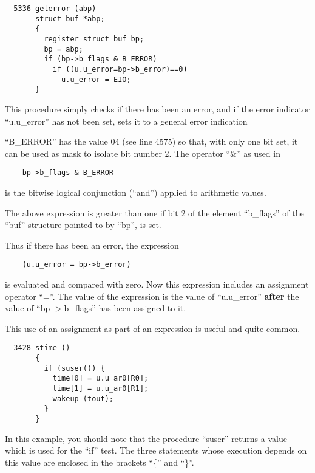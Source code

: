 
\begin{verbatim}
  5336 geterror (abp)
       struct buf *abp;
       {
         register struct buf bp;
         bp = abp;
         if (bp->b flags & B_ERROR)
           if ((u.u_error=bp->b_error)==0)
             u.u_error = EIO;
       }
\end{verbatim}



This procedure simply checks if there
has been an error, and if the error
indicator ``u.u\_error'' has not been set,
sets it to a general error indication

``B\_ERROR'' has the value 04 (see line
4575) so that, with only one bit set,
it can be used as mask to isolate bit
number 2. The operator ``\&'' as used in

\begin{verbatim}
    bp->b_flags & B_ERROR
\end{verbatim}

\noindent is the bitwise logical conjunction
(``and'') applied to arithmetic values.

The above expression is greater than
one if bit 2 of the element ``b\_flags''
of the ``buf'' structure pointed to by
``bp'', is set.

Thus if there has been an error, the
expression

\begin{verbatim}
    (u.u_error = bp->b_error)
\end{verbatim}

\noindent is evaluated and compared with zero.
Now this expression includes an assignment operator ``=''.
The value of the expression is the value of ``u.u\_error''
{\bf after} the value of ``bp-$>$b\_flags'' has
been assigned to it.

This use of an assignment as part of an
expression is useful and quite common.



\begin{verbatim}
  3428 stime ()
       {
         if (suser()) {
           time[0] = u.u_ar0[R0];
           time[1] = u.u_ar0[R1];
           wakeup (tout);
         }
       }
\end{verbatim}

In this example, you should note that
the procedure ``suser'' returns a value
which is used for the ``if'' test. The
three statements whose execution
depends on this value are enclosed in
the brackets ``\{'' and ``\}''.

